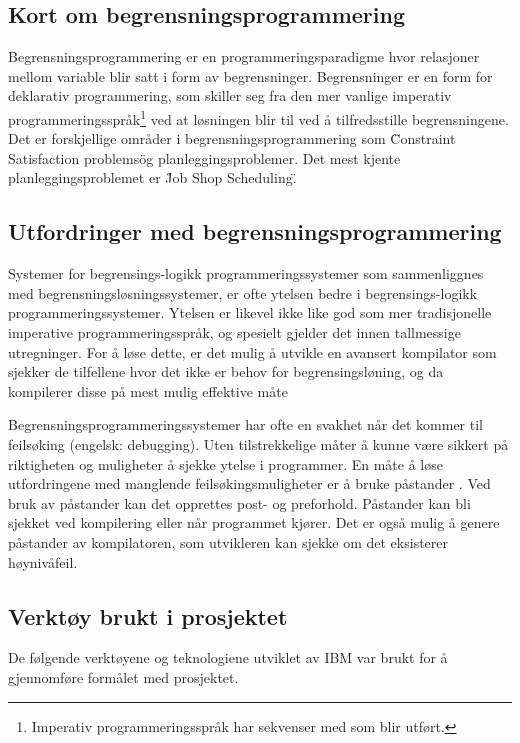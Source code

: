 \subsection{Kort om begrensningsprogrammering}
Begrensningsprogrammering er en programmeringsparadigme hvor relasjoner mellom variable blir satt i form av begrensninger. Begrensninger er en form for deklarativ programmering, som skiller seg fra den mer vanlige imperativ programmeringsspråk\footnote{Imperativ programmeringsspråk har sekvenser med som blir utført.} ved at løsningen blir til ved å tilfredsstille begrensningene. Det er forskjellige områder i begrensningsprogrammering som \"Constraint Satisfaction problems\" og planleggingsproblemer. Det mest kjente planleggingsproblemet er \"Job Shop Scheduling\".\cite{cpwikipedia}

\subsection{Utfordringer med begrensningsprogrammering}
Systemer for begrensings-logikk programmeringssystemer som sammenliggnes med begrensningsløsningssystemer, er ofte ytelsen bedre i begrensings-logikk programmeringssystemer. Ytelsen er likevel ikke like god som mer tradisjonelle imperative programmeringsspråk, og spesielt gjelder det innen tallmessige utregninger. For å løse dette, er det mulig å utvikle en avansert kompilator som sjekker de tilfellene hvor det ikke er behov for begrensingsløning, og da kompilerer disse på mest mulig effektive måte \cite{challengesManuel}

Begrensningsprogrammeringssystemer har ofte en svakhet når det kommer til feilsøking (engelsk: debugging). Uten tilstrekkelige måter å kunne være sikkert på riktigheten og muligheter å sjekke ytelse i programmer. En måte å løse utfordringene med manglende feilsøkingsmuligheter er å bruke påstander . Ved bruk av påstander kan det opprettes post- og preforhold. Påstander kan bli sjekket ved kompilering eller når programmet kjører. Det er også mulig å genere påstander av kompilatoren, som utvikleren kan sjekke om det eksisterer høynivåfeil\cite{challengesManuel}.

\subsection{Verktøy brukt i prosjektet}
De følgende verktøyene og teknologiene utviklet av IBM var brukt for å gjennomføre formålet med prosjektet.

